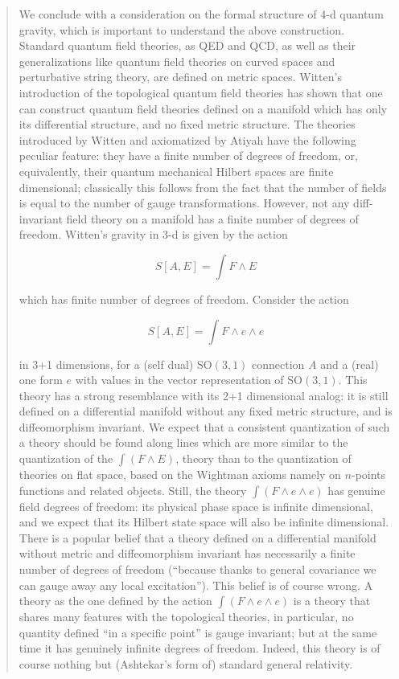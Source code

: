 \documentclass[12pt]{article}
\begin{document}
\begin{quote}
We conclude with a consideration on the formal structure of 4-d quantum
gravity, which is important to understand the above construction.
Standard quantum field theories, as QED and QCD, as well as their
generalizations like quantum field theories on curved spaces and
perturbative string theory, are defined on metric spaces. Witten's
introduction of the topological quantum field theories has shown that
one can construct quantum field theories defined on a manifold which has
only its differential structure, and no fixed metric structure. The
theories introduced by Witten and axiomatized by Atiyah have the
following peculiar feature: they have a finite number of degrees of
freedom, or, equivalently, their quantum mechanical Hilbert spaces are
finite dimensional; classically this follows from the fact that the
number of fields is equal to the number of gauge transformations.
However, not any diff-invariant field theory on a manifold has a finite
number of degrees of freedom. Witten's gravity in 3-d is given by the
action

\[S[A,E] = \int F\wedge E \]

which has finite number of degrees of freedom. Consider the action

\[S[A,E] = \int F\wedge e\wedge e \]

in 3+1 dimensions, for a (self dual) \(\mathrm{SO}(3,1)\) connection
\(A\) and a (real) one form \(e\) with values in the vector
representation of \(\mathrm{SO}(3,1)\). This theory has a strong
resemblance with its 2+1 dimensional analog: it is still defined on a
differential manifold without any fixed metric structure, and is
diffeomorphism invariant. We expect that a consistent quantization of
such a theory should be found along lines which are more similar to the
quantization of the \(\int(F\wedge E)\), theory than to the quantization
of theories on flat space, based on the Wightman axioms namely on
\(n\)-points functions and related objects. Still, the theory
\(\int(F\wedge e\wedge e)\) has genuine field degrees of freedom: its
physical phase space is infinite dimensional, and we expect that its
Hilbert state space will also be infinite dimensional. There is a
popular belief that a theory defined on a differential manifold without
metric and diffeomorphism invariant has necessarily a finite number of
degrees of freedom (``because thanks to general covariance we can gauge
away any local excitation''). This belief is of course wrong. A theory
as the one defined by the action \(\int(F\wedge e\wedge e)\) is a theory
that shares many features with the topological theories, in particular,
no quantity defined ``in a specific point'' is gauge invariant; but at
the same time it has genuinely infinite degrees of freedom. Indeed, this
theory is of course nothing but (Ashtekar's form of) standard general
relativity.


\end{quote}
\end{document}
